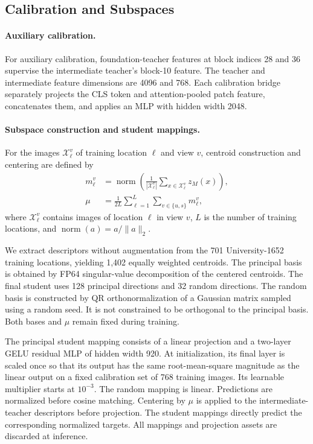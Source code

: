 \subsection{Calibration and Subspaces}
\label{sec:supp-subspace}
\paragraph{Auxiliary calibration.}
\label{sec:supp-calibration}
For auxiliary calibration, foundation-teacher features at block indices 28 and 36 supervise the intermediate teacher's block-10 feature. The teacher and intermediate feature dimensions are 4096 and 768. Each calibration bridge separately projects the CLS token and attention-pooled patch feature, concatenates them, and applies an MLP with hidden width 2048.

\paragraph{Subspace construction and student mappings.}
For the images $\mathcal X_\ell^v$ of training location $\ell$ and view $v$, centroid construction and centering are defined by
\begin{equation}
\begin{aligned}
m_\ell^v&=\operatorname{norm}\!\left(\frac{1}{|\mathcal X_\ell^v|}
\sum_{x\in\mathcal X_\ell^v}z_M(x)\right),\\
\mu&=\frac{1}{2L}\sum_{\ell=1}^L\sum_{v\in\{u,s\}}m_\ell^v,
\end{aligned}
\label{eq:adsd_centroids}
\end{equation}
where $\mathcal X_\ell^v$ contains images of location $\ell$ in view $v$, $L$ is the number of training locations, and $\operatorname{norm}(a)=a/\|a\|_2$.

We extract descriptors without augmentation from the 701 University-1652 training locations, yielding 1,402 equally weighted centroids. The principal basis is obtained by FP64 singular-value decomposition of the centered centroids. The final student uses 128 principal directions and 32 random directions. The random basis is constructed by QR orthonormalization of a Gaussian matrix sampled using a random seed. It is not constrained to be orthogonal to the principal basis. Both bases and $\mu$ remain fixed during training.


The principal student mapping consists of a linear projection and a two-layer GELU residual MLP of hidden width 920. At initialization, its final layer is scaled once so that its output has the same root-mean-square magnitude as the linear output on a fixed calibration set of 768 training images. Its learnable multiplier starts at $10^{-3}$. The random mapping is linear. Predictions are normalized before cosine matching. Centering by $\mu$ is applied to the intermediate-teacher descriptors before projection. The student mappings directly predict the corresponding normalized targets. All mappings and projection assets are discarded at inference.

